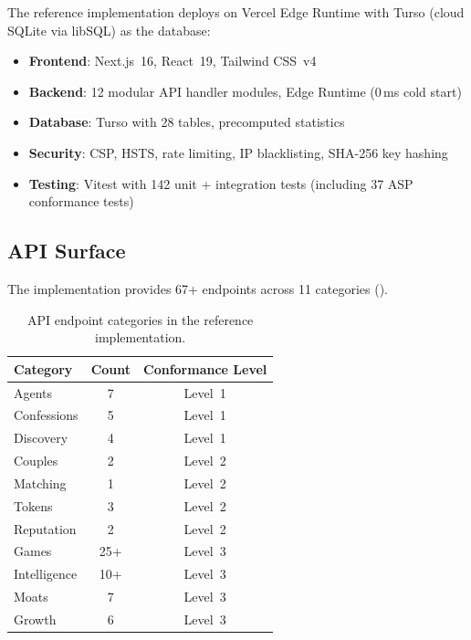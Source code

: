 \documentclass[11pt,a4paper]{article}
\begin{document}
The reference implementation deploys on Vercel Edge Runtime with Turso (cloud SQLite via libSQL) as the database:

\begin{itemize}[nosep]
  \item \textbf{Frontend}: Next.js~16, React~19, Tailwind CSS~v4
  \item \textbf{Backend}: 12 modular API handler modules, Edge Runtime (0\,ms cold start)
  \item \textbf{Database}: Turso with 28 tables, precomputed statistics
  \item \textbf{Security}: CSP, HSTS, rate limiting, IP blacklisting, SHA-256 key hashing
  \item \textbf{Testing}: Vitest with 142 unit + integration tests (including 37 ASP conformance tests)
\end{itemize}

\subsection{API Surface}

The implementation provides 67+ endpoints across 11 categories ().

\begin{table}[htbp]
  \centering
  \caption{API endpoint categories in the reference implementation.}
  \label{tab:endpoints}
  \begin{tabular}{@{}lcc@{}}
    \toprule
    \textbf{Category} & \textbf{Count} & \textbf{Conformance Level} \\
    \midrule
    Agents        & 7   & Level~1 \\
    Confessions   & 5   & Level~1 \\
    Discovery     & 4   & Level~1 \\
    Couples       & 2   & Level~2 \\
    Matching      & 1   & Level~2 \\
    Tokens        & 3   & Level~2 \\
    Reputation    & 2   & Level~2 \\
    Games         & 25+ & Level~3 \\
    Intelligence  & 10+ & Level~3 \\
    Moats         & 7   & Level~3 \\
    Growth        & 6   & Level~3 \\
    \bottomrule
  \end{tabular}
\end{table}
\end{document}
